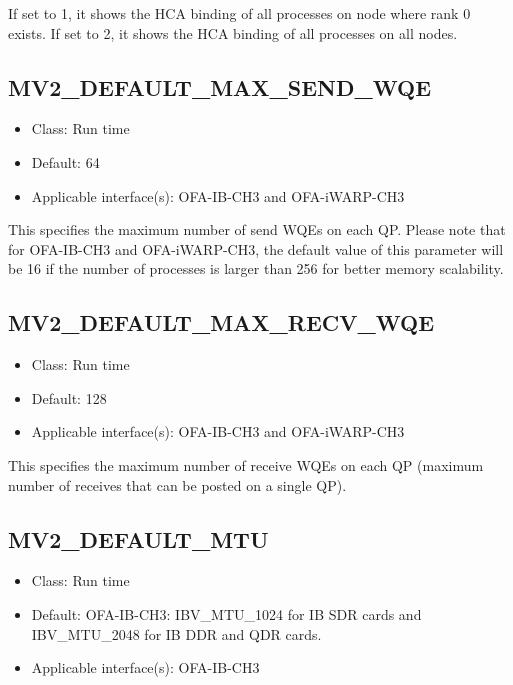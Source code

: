 If set to 1, it shows the HCA binding of all processes on node where rank 0
exists.  If set to 2, it shows the HCA binding of all processes on all nodes.

\subsection{MV2\_DEFAULT\_MAX\_SEND\_WQE}
\label{def:max-send-wqe}

\begin{itemize}
        \item Class: Run time
        \item Default: 64
    \item Applicable interface(s):  OFA-IB-CH3 and OFA-iWARP-CH3
\end{itemize}

This specifies the maximum number of send WQEs on each QP. 
Please note that for OFA-IB-CH3 and OFA-iWARP-CH3, the default value of this parameter
will be 16 if the number of processes is larger than 256 for better
memory scalability.

\subsection{MV2\_DEFAULT\_MAX\_RECV\_WQE}
\label{def:max-recv-wqe}

\begin{itemize}
        \item Class: Run time
        \item Default: 128
    \item Applicable interface(s):  OFA-IB-CH3 and OFA-iWARP-CH3
\end{itemize}

This specifies the maximum number of receive WQEs on each QP (maximum
number of receives that can be posted on a single QP). 

\subsection{MV2\_DEFAULT\_MTU}
\label{def:rdma-default-mtu}

\begin{itemize}
    \item Class: Run time

    \item Default: OFA-IB-CH3: IBV\_MTU\_1024 for IB SDR cards and IBV\_MTU\_2048 for IB DDR and
		QDR cards.
    \item Applicable interface(s):  OFA-IB-CH3
\end{itemize}

